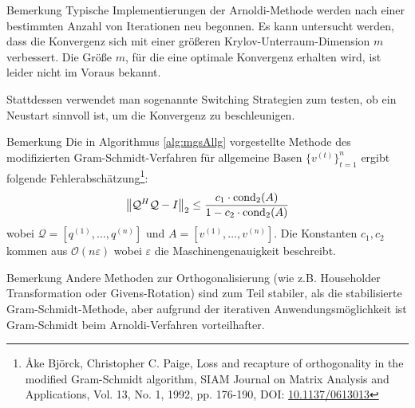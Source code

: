 \begin{colbox}{Bemerkung}
  Typische Implementierungen der Arnoldi-Methode werden nach einer bestimmten Anzahl von Iterationen neu begonnen.
  Es kann untersucht werden, dass die Konvergenz sich mit einer größeren Krylov-Unterraum-Dimension $m$ verbessert.
  Die Größe $m$, für die eine optimale Konvergenz erhalten wird, ist leider nicht im Voraus bekannt. 

  Stattdessen verwendet man sogenannte \glqq{}Switching\grqq{} Strategien zum testen, ob ein Neustart sinnvoll ist, 
  um die Konvergenz zu beschleunigen.
\end{colbox}

\begin{colbox}{Bemerkung}
  Die in Algorithmus \ref{alg:mgsAllg} vorgestellte Methode des modifizierten Gram-Schmidt-Verfahren für allgemeine 
  Basen $\{v^{(t)}\}_{t=1}^n$ ergibt folgende Fehlerabschätzung\footnote{
    Åke Björck, Christopher C. Paige, Loss and recapture of orthogonality in the modified Gram-Schmidt algorithm, 
    SIAM Journal on Matrix Analysis and Applications, Vol. 13, No. 1, 1992, pp. 176-190, DOI: 
    \href{https://doi.org/10.1137/0613013}{10.1137/0613013}
  }:
  \begin{align*}
    \vertn{2}{\mathcal{Q}^{H}\mathcal{Q}-I}_2 \leq \dfrac{c_1\cdot \cond_2(A)}{1-c_2\cdot\cond_2(A)}
  \end{align*}
  wobei $\mathcal{Q} = [q^{(1)}, \dots, q^{(n)}]$ und $A=[v^{(1)}, \dots, v^{(n)}]$. Die Konstanten $c_1,c_2$ kommen 
  aus $\mathcal{O}(n\varepsilon)$ wobei $\varepsilon$ die Maschinengenauigkeit beschreibt.
\end{colbox}

\begin{colbox}{Bemerkung}
  Andere Methoden zur Orthogonalisierung (wie z.B. Householder Transformation oder Givens-Rotation) sind zum Teil 
  stabiler, als die stabilisierte Gram-Schmidt-Methode, aber aufgrund der iterativen Anwendungsmöglichkeit ist 
  Gram-Schmidt beim Arnoldi-Verfahren vorteilhafter.
\end{colbox}

